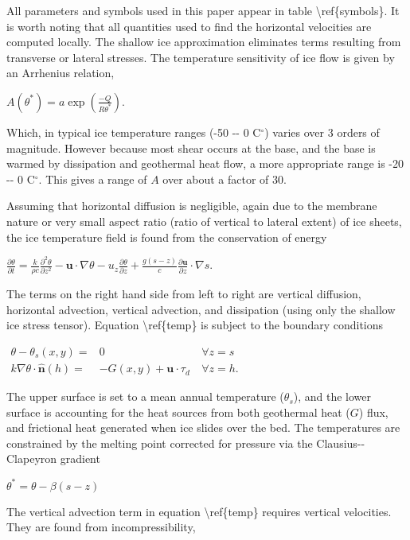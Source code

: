 All parameters and symbols used in this paper appear in table
\textbackslash{}ref\{symbols\}. It is worth noting that all quantities
used to find the horizontal velocities are computed locally. The shallow
ice approximation eliminates terms resulting from transverse or lateral
stresses. The temperature sensitivity of ice flow is given by an
Arrhenius relation,

$
A(\theta^*) = a \exp \left(\frac{-Q}{R\theta^*}\right).
$

Which, in typical ice temperature ranges (-50 -{}- 0 C$^\circ$) varies
over 3 orders of magnitude. However because most shear occurs at the
base, and the base is warmed by dissipation and geothermal heat flow, a
more appropriate range is -20 -{}- 0 C$^\circ$. This gives a range of
$A$ over about a factor of 30.

Assuming that horizontal diffusion is negligible, again due to the
membrane nature or very small aspect ratio (ratio of vertical to lateral
extent) of ice sheets, the ice temperature field is found from the
conservation of energy

$ 
\frac{\partial \theta}{\partial t} = \frac{k}{\rho c}
\frac{\partial^2
\theta}{\partial z^2} -
\mathbf{u} \cdot \nabla \theta -
u_z \frac{\partial \theta}{\partial z} 
+ \frac{g(s-z)}{c}\frac{\partial \mathbf{u}}{\partial z} \cdot \nabla s.
$

The terms on the right hand side from left to right are vertical
diffusion, horizontal advection, vertical advection, and dissipation
(using only the shallow ice stress tensor). Equation
\textbackslash{}ref\{temp\} is subject to the boundary conditions

$\begin{matrix}
\theta - \theta_s(x,y) = & 0 &~\forall z=s \\
k \nabla \theta \cdot \mathbf{\hat n}(h) =& -G(x,y) + \mathbf{u} \cdot \tau_d
&~\forall z=h.
\end{matrix}$

The upper surface is set to a mean annual temperature ($\theta_s$), and
the lower surface is accounting for the heat sources from both
geothermal heat ($G$) flux, and frictional heat generated when ice
slides over the bed. The temperatures are constrained by the melting
point corrected for pressure via the Clausius-{}-Clapeyron gradient

$
\theta^* = \theta - \beta (s-z)
$

The vertical advection term in equation \textbackslash{}ref\{temp\}
requires vertical velocities. They are found from incompressibility,

